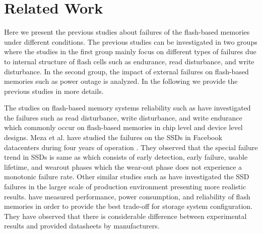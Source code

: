 \vspace{-1em}
\section{Related Work}
\vspace{-0.6em}
\label{SEC:REL}

Here we present the previous studies about failures of the flash-based memories under different conditions. The previous studies can be investigated in two groups where the studies in the first group mainly focus on different types of failures due to internal structure of flash cells  such as endurance, read disturbance, and write disturbance. In the second group, the impact of external failures on flash-based memories such as power outage is analyzed. In the following we provide the previous studies in more details.

The studies on flash-based memory systems reliability such as \cite{meza2015large, Boboila2010a, narayanan2016ssd, grupp2009characterizing,schroeder2016flash} have investigated the failures such as read disturbance, write disturbance, and write endurance which commonly occur on flash-based memories in chip level and device level designs.
Meza et al. have studied the failures on the SSDs in Facebook datacenters during four years of operation \cite{meza2015large}. They observed that the special failure trend in SSDs is same as  which consists of early detection, early failure, usable lifetime, and wearout phases  which the wear-out phase does not experience a monotonic failure rate.
Other similar studies such as \cite {narayanan2016ssd} have investigated the SSD failures in the larger scale of production environment presenting more realistic results.
\cite {Boboila2010a, grupp2009characterizing} have measured performance, power consumption, and reliability of flash memories in order to provide the best trade-off for storage system configuration. They have observed that there is considerable difference between experimental results and provided datasheets  by manufacturers. 


